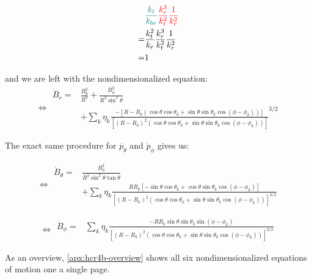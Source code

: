 \begin{align}
    & \textcolor{teal}{\frac{k_t}{k_{br}}} \textcolor{red}{\frac{k_r^3}{k_t^2}\frac{1}{k_r^2}} \\
    = &\frac{k_t^2}{k_r} \frac{k_r^3}{k_t^2} \frac{1}{k_r^2} \\
    = &1
\end{align}


and we are left with the nondimensionalized equation:
\begin{equation}
    \Leftrightarrow
    \boxed{
        \!\begin{aligned}
        \dot{B}_r = &\frac{B_\theta^2}{R^3} + \frac{B_\phi^2}{R^3 \sin^2{\theta}} \\
        & + \sum\limits_{k} \eta_k \frac{-\left[R - R_k \left(\cos{\theta}\cos{\theta_k} + \sin{\theta}\sin{\theta_k}\cos{(\phi - \phi_k)}\right) \right]}{\left[(R - R_k)^2 \left(\cos{\theta}\cos{\theta_k} + \sin{\theta}\sin{\theta_k}\cos{(\phi - \phi_k)} \right) \right]}^{3/2}
        \end{aligned}
    }
\end{equation}

The exact same procedure for \(\dot{p_\theta}\) and \(\dot{p}_\phi\) gives us:

\begin{equation}
    \Leftrightarrow
    \boxed{
        \!\begin{aligned}
            \dot{B}_\theta = &\frac{B_\phi^2}{R^2 \sin^2{\theta} \tan{\theta}} \\
            &+ \sum\limits_{k} \eta_k \frac{R R_k \left[-\sin{\theta}\cos{\theta_k} + \cos{\theta}\sin{\theta_k}\cos{(\phi - \phi_k)} \right]}{\left[(R - R_k)^2 \left(\cos{\theta}\cos{\theta_k} + \sin{\theta}\sin{\theta_k}\cos{(\phi - \phi_k)} \right) \right]^{3/2}}
        \end{aligned}
    }
\end{equation}

\begin{equation}
    \Leftrightarrow
    \boxed{
        \!\begin{aligned}
            \dot{B}_\phi = &\sum\limits_{k} \eta_k \frac{- R R_k \sin{\theta}\sin{\theta_k}\sin{(\phi - \phi_k)}}{\left[(R - R_k)^2 \left(\cos{\theta}\cos{\theta_k} + \sin{\theta}\sin{\theta_k}\cos{(\phi - \phi_k)} \right) \right]^{3/2}}
        \end{aligned}
    }
\end{equation}

As an overview, \cref{apx:hcr4b-overview} shows all six nondimensionalized equations of motion one a single page.

